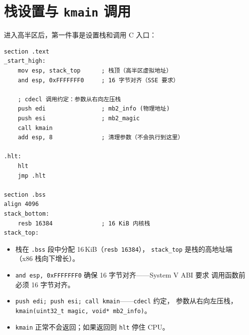 \section{栈设置与 \texttt{kmain} 调用}

进入高半区后，第一件事是设置栈和调用 C 入口：

\begin{lstlisting}[style=nasmstyle]
section .text
_start_high:
    mov esp, stack_top      ; 栈顶（高半区虚拟地址）
    and esp, 0xFFFFFFF0     ; 16 字节对齐（SSE 要求）

    ; cdecl 调用约定：参数从右向左压栈
    push edi                ; mb2_info (物理地址)
    push esi                ; mb2_magic
    call kmain
    add esp, 8              ; 清理参数（不会执行到这里）

.hlt:
    hlt
    jmp .hlt

section .bss
align 4096
stack_bottom:
    resb 16384              ; 16 KiB 内核栈
stack_top:
\end{lstlisting}

\begin{itemize}
  \item 栈在 \texttt{.bss} 段中分配 16\,KiB（\texttt{resb 16384}），
        \texttt{stack\_top} 是栈的高地址端（x86 栈向下增长）。
  \item \texttt{and esp, 0xFFFFFFF0} 确保 16 字节对齐——System V ABI 要求
        调用函数前  必须 16 字节对齐。
  \item \texttt{push edi; push esi; call kmain}——\texttt{cdecl} 约定，
        参数从右向左压栈，\texttt{kmain(uint32\_t magic, void* mb2\_info)}。
  \item \texttt{kmain} 正常不会返回；如果返回则 \texttt{hlt} 停住 CPU。
\end{itemize}


